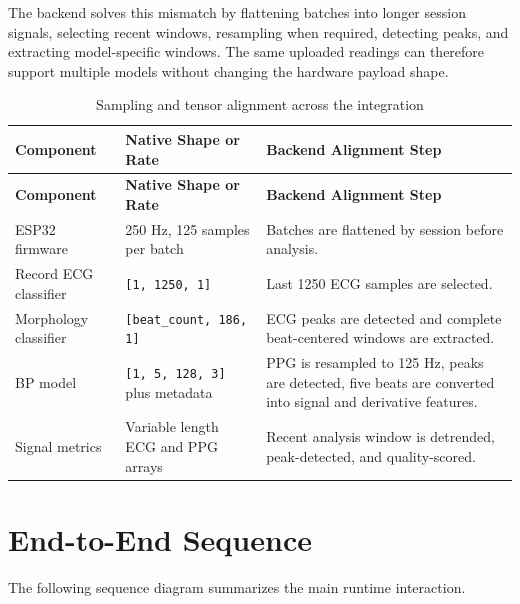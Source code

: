 The backend solves this mismatch by flattening batches into longer session signals, selecting recent windows, resampling when required, detecting peaks, and extracting model-specific windows. The same uploaded readings can therefore support multiple models without changing the hardware payload shape.

\begin{longtable}{p{}p{}p{}}
\caption{Sampling and tensor alignment across the integration}\\
\toprule
\textbf{Component} & \textbf{Native Shape or Rate} & \textbf{Backend Alignment Step}\\
\midrule
\endfirsthead
\toprule
\textbf{Component} & \textbf{Native Shape or Rate} & \textbf{Backend Alignment Step}\\
\midrule
\endhead
ESP32 firmware & 250 Hz, 125 samples per batch & Batches are flattened by session before analysis.\\
Record ECG classifier & \texttt{[1, 1250, 1]} & Last 1250 ECG samples are selected.\\
Morphology classifier & \texttt{[beat\_count, 186, 1]} & ECG peaks are detected and complete beat-centered windows are extracted.\\
BP model & \texttt{[1, 5, 128, 3]} plus metadata & PPG is resampled to 125 Hz, peaks are detected, five beats are converted into signal and derivative features.\\
Signal metrics & Variable length ECG and PPG arrays & Recent analysis window is detrended, peak-detected, and quality-scored.\\
\bottomrule
\end{longtable}

\section{End-to-End Sequence}

The following sequence diagram summarizes the main runtime interaction.

